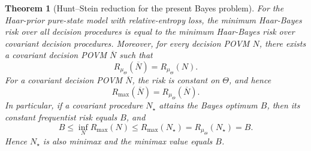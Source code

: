 \documentclass[10pt,a4paper]{amsart}
\newtheorem{theorem}{Theorem}
\begin{document}
\begin{theorem}[Hunt--Stein reduction for the present Bayes problem]
\label{thm:covariant_reduction}
For the Haar-prior pure-state model with relative-entropy loss, the minimum
Haar-Bayes risk over all decision procedures is equal to the minimum Haar-Bayes
risk over covariant decision procedures.  Moreover, for every decision POVM
\(N\), there exists a covariant decision POVM \(\overline N\) such that
\[
    R_{\mu_\Theta}(\overline N)=R_{\mu_\Theta}(N).
\]
For a covariant decision POVM \(\overline N\), the risk is constant on
\(\Theta\), and hence
\[
    R_{\max}(\overline N)=R_{\mu_\Theta}(\overline N).
\]
In particular, if a covariant procedure \(N_\star\) attains the Bayes optimum
\(B\), then its constant frequentist risk equals \(B\), and
\[
    B
    \le
    \inf_N R_{\max}(N)
    \le
    R_{\max}(N_\star)
    =
    R_{\mu_\Theta}(N_\star)
    =B.
\]
Hence \(N_\star\) is also minimax and the minimax value equals \(B\).
\end{theorem}
\end{document}
